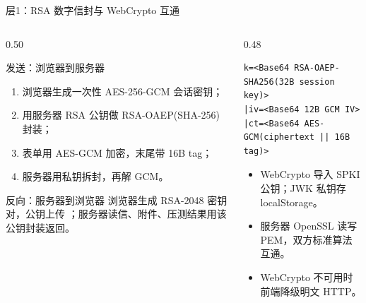 \documentclass[aspectratio=169,10pt]{beamer}
\newcommand{\code}[1]{\texttt{\small\detokenize{#1}}}
\begin{document}
\begin{frame}[fragile]{层1：RSA 数字信封与 WebCrypto 互通}
  \begin{columns}[T]
    \begin{column}{0.50\textwidth}
      \begin{block}{发送：浏览器到服务器}
        \small
        \begin{enumerate}
          \item 浏览器生成一次性 AES-256-GCM 会话密钥；
          \item 用服务器 RSA 公钥做 RSA-OAEP(SHA-256) 封装；
          \item 表单用 AES-GCM 加密，末尾带 16B tag；
          \item 服务器用私钥拆封，再解 GCM。
        \end{enumerate}
      \end{block}
      \begin{block}{反向：服务器到浏览器}
        \small
        浏览器生成 RSA-2048 密钥对，公钥上传 \code{/api/webpub}；服务器读信、附件、压测结果用该公钥封装返回。
      \end{block}
    \end{column}
    \begin{column}{0.48\textwidth}
      \begin{lstlisting}[style=protostyle,basicstyle=\ttfamily\tiny]
k=<Base64 RSA-OAEP-SHA256(32B session key)>
|iv=<Base64 12B GCM IV>
|ct=<Base64 AES-GCM(ciphertext || 16B tag)>
      \end{lstlisting}
      \begin{itemize}
        \small
        \item WebCrypto 导入 SPKI 公钥；JWK 私钥存 localStorage。
        \item 服务器 OpenSSL 读写 PEM，双方标准算法互通。
        \item WebCrypto 不可用时前端降级明文 HTTP。
      \end{itemize}
      
    \end{column}
  \end{columns}
\end{frame}
\end{document}
